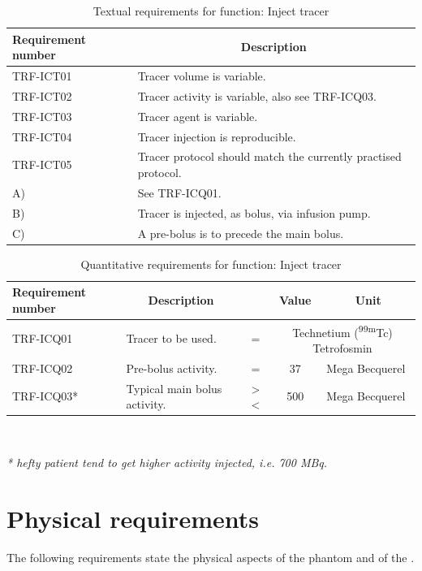\begin{table}[H]
\caption{Textual requirements for function: Inject tracer}
\label{tab:injtrac_text}
\begin{tabular}{p{25mm}|p{115mm}|}
	\textbf{Requirement number} & \multicolumn{1}{c}{\textbf{Description}} \\
	\hline
	TRF-ICT01 			& Tracer volume is variable. \\
	TRF-ICT02			& Tracer activity is variable, also see TRF-ICQ03. \\
	TRF-ICT03			& Tracer agent is variable. \\
	TRF-ICT04 			& Tracer injection is reproducible.\\
	TRF-ICT05 			& Tracer protocol should match the currently practised protocol. \\
	\hspace{1.5cm} A) 	& See TRF-ICQ01. \\
	\hspace{1.5cm} B) 	& Tracer is injected, as bolus, via infusion pump. \\
	\hspace{1.5cm} C) 	& A pre-bolus is to precede the main bolus. \\
	\cline{2-2}
\end{tabular}
\end{table}

\begin{table}[H]
\caption{Quantitative requirements for function: Inject tracer}
\label{tab:injtrac_quan}
\begin{tabular}{p{25mm}|p{65mm}ccp{20mm}|}
	\textbf{Requirement number} & \multicolumn{1}{c}{\textbf{Description}} & \multicolumn{1}{c}{ } & \multicolumn{1}{c}{\textbf{Value}} & \multicolumn{1}{c}{\textbf{Unit}} \\
	\hline
	TRF-ICQ01 	& Tracer to be used. 			& = 			& \multicolumn{2}{p{35mm}|}{Technetium (\textsuperscript{99m}Tc) Tetrofosmin} \\
	TRF-ICQ02 	& Pre-bolus activity.			& = 			& 37				& Mega Becquerel \\
	TRF-ICQ03*	& Typical main bolus activity. 	& > \spacing < 	& 500 \spacing 700 	& Mega Becquerel \\
	\cline{2-5}
\end{tabular} \\
\raggedright
\textit{* hefty patient tend to get higher activity injected, i.e. 700 MBq.}
\end{table}

\section{Physical requirements}
The following requirements state the physical aspects of the phantom and of the .

